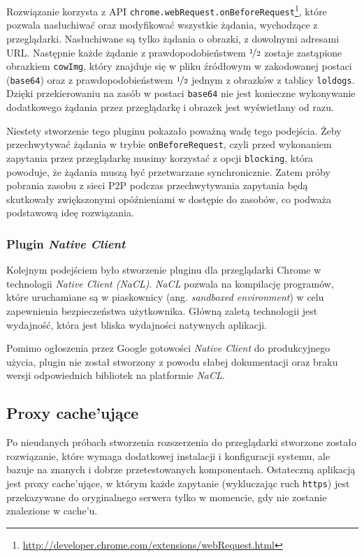 \documentclass[a4paper,11pt]{scrartcl}
\newcommand{\f}{\texttt}
\newcommand{\keszu}{cache'u}
\newcommand{\keszujace}{cache'ujące}
\begin{document}
Rozwiązanie korzysta z API \f{chrome.webRequest.onBeforeRequest}\footnote{\url{http://developer.chrome.com/extensions/webRequest.html}}, które pozwala nasłuchiwać oraz modyfikować wszystkie żądania, wychodzące z przeglądarki. Nasłuchiwane są tylko żądania o obrazki, z dowolnymi adresami URL. Następnie każde żądanie z prawdopodobieństwem $\nicefrac{1}{2}$ zostaje zastąpione obrazkiem \f{cowImg}, który znajduje się w pliku źródłowym w zakodowanej postaci (\f{base64}) oraz z prawdopodobieństwem $\nicefrac{1}{2}$ jednym z obrazków z tablicy \f{loldogs}. Dzięki przekierowaniu na zasób w postaci \f{base64} nie jest konieczne wykonywanie dodatkowego żądania przez przeglądarkę i obrazek jest wyświetlany od razu. 

Niestety stworzenie tego pluginu pokazało poważną wadę tego podejścia. Żeby przechwytywać żądania w trybie \f{onBeforeRequest}, czyli przed wykonaniem zapytania przez przeglądarkę musimy korzystać z opcji \f{blocking}, która powoduje, że żądania muszą być przetwarzane synchronicznie. Zatem próby pobrania zasobu z sieci P2P podczas przechwytywania zapytania będą skutkowały zwiększonymi opóźnieniami w dostępie do zasobów, co podważa podstawową ideę rozwiązania.

\subsubsection{Plugin \textit{Native Client}}
\label{sect_plugin_2}
Kolejnym podejściem było stworzenie pluginu dla przeglądarki Chrome w technologii \textit{Native Client (NaCL)}. \textit{NaCL} pozwala na kompilację programów, które uruchamiane są w piaskownicy (ang. \textit{sandboxed environment}) w celu zapewnienia bezpieczeństwa użytkownika. Główną zaletą technologii jest wydajność, która jest bliska wydajności natywnych aplikacji.

Pomimo ogłoszenia przez Google gotowości \textit{Native Client} do produkcyjnego użycia, plugin nie został stworzony z powodu słabej dokumentacji oraz braku wersji odpowiednich bibliotek na platformie \textit{NaCL}.

\subsection{Proxy \keszujace}
\label{sect_impl_proxy}
Po nieudanych próbach stworzenia rozszerzenia do przeglądarki stworzone zostało rozwiązanie, które wymaga dodatkowej instalacji i konfiguracji systemu, ale bazuje na znanych i dobrze przetestowanych komponentach. Ostateczną aplikacją jest proxy \keszujace, w którym każde zapytanie (wykluczając ruch \f{https}) jest przekazywane do oryginalnego serwera tylko w momencie, gdy nie zostanie znalezione w \keszu.
\end{document}

